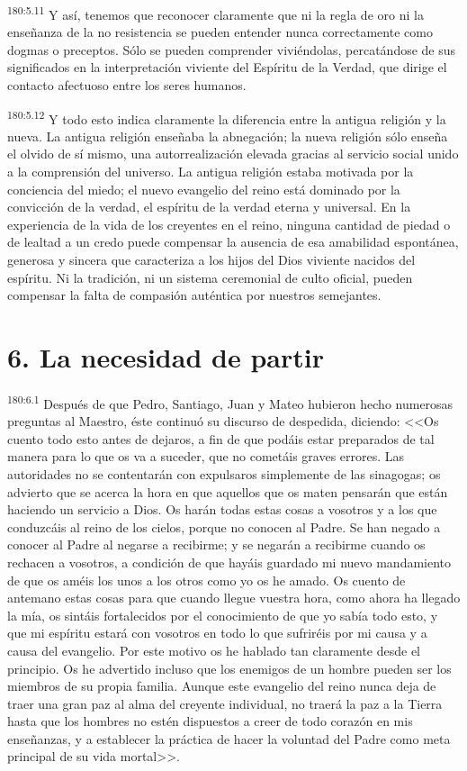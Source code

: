 \par 
\textsuperscript{180:5.11} Y así, tenemos que reconocer claramente que ni la regla de oro ni la enseñanza de la no resistencia se pueden entender nunca correctamente como dogmas o preceptos. Sólo se pueden comprender viviéndolas, percatándose de sus significados en la interpretación viviente del Espíritu de la Verdad, que dirige el contacto afectuoso entre los seres humanos.

\par 
\textsuperscript{180:5.12} Y todo esto indica claramente la diferencia entre la antigua religión y la nueva. La antigua religión enseñaba la abnegación; la nueva religión sólo enseña el olvido de sí mismo, una autorrealización elevada gracias al servicio social unido a la comprensión del universo. La antigua religión estaba motivada por la conciencia del miedo; el nuevo evangelio del reino está dominado por la convicción de la verdad, el espíritu de la verdad eterna y universal. En la experiencia de la vida de los creyentes en el reino, ninguna cantidad de piedad o de lealtad a un credo puede compensar la ausencia de esa amabilidad espontánea, generosa y sincera que caracteriza a los hijos del Dios viviente nacidos del espíritu. Ni la tradición, ni un sistema ceremonial de culto oficial, pueden compensar la falta de compasión auténtica por nuestros semejantes.

\section*{6. La necesidad de partir}
\par 
\textsuperscript{180:6.1} Después de que Pedro, Santiago, Juan y Mateo hubieron hecho numerosas preguntas al Maestro, éste continuó su discurso de despedida, diciendo: <<Os cuento todo esto antes de dejaros, a fin de que podáis estar preparados de tal manera para lo que os va a suceder, que no cometáis graves errores. Las autoridades no se contentarán con expulsaros simplemente de las sinagogas; os advierto que se acerca la hora en que aquellos que os maten pensarán que están haciendo un servicio a Dios. Os harán todas estas cosas a vosotros y a los que conduzcáis al reino de los cielos, porque no conocen al Padre. Se han negado a conocer al Padre al negarse a recibirme; y se negarán a recibirme cuando os rechacen a vosotros, a condición de que hayáis guardado mi nuevo mandamiento de que os améis los unos a los otros como yo os he amado. Os cuento de antemano estas cosas para que cuando llegue vuestra hora, como ahora ha llegado la mía, os sintáis fortalecidos por el conocimiento de que yo sabía todo esto, y que mi espíritu estará con vosotros en todo lo que sufriréis por mi causa y a causa del evangelio. Por este motivo os he hablado tan claramente desde el principio. Os he advertido incluso que los enemigos de un hombre pueden ser los miembros de su propia familia. Aunque este evangelio del reino nunca deja de traer una gran paz al alma del creyente individual, no traerá la paz a la Tierra hasta que los hombres no estén dispuestos a creer de todo corazón en mis enseñanzas, y a establecer la práctica de hacer la voluntad del Padre como meta principal de su vida mortal>>.

